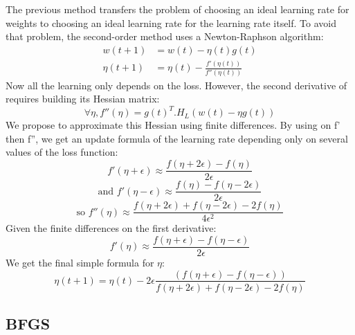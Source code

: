 \documentclass{article}
\begin{document}
  The previous method transfers the problem of choosing an ideal learning rate for weights to choosing an ideal learning rate for the learning rate itself. To avoid that problem, the second-order method uses a Newton-Raphson algorithm:\\
  \begin{align}  
  w(t+1) &= w(t) -\eta(t)g(t)\\
  \eta(t+1) &= \eta(t) - \frac{f'(\eta(t))}{f''(\eta(t))}
  \end{align}
  Now all the learning only depends on the loss. However, the second derivative of requires building its Hessian matrix:\\
  \begin{equation}
  \forall \eta, f''(\eta) = g(t)^{T}.H_{L}(w(t)-\eta g(t))
  \end{equation}
  We propose to approximate this Hessian using finite differences. By using on f' then f'', we get an update formula of the learning rate depending only on several values of the loss function:\\
  \begin{equation}
  f'(\eta+\epsilon) \approx \frac{f(\eta + 2\epsilon)-f(\eta)}{2\epsilon}
  \end{equation}
  \begin{equation}
  \text{and }f'(\eta-\epsilon) \approx \frac{f(\eta)-f(\eta-2\epsilon)}{2\epsilon}
  \end{equation}  
  \begin{equation}
  \text{so }f''(\eta) \approx \frac{f(\eta+2\epsilon)+f(\eta-2\epsilon)-2f(\eta)}{4 \epsilon^{2}}
  \end{equation}
  Given the finite differences on the first derivative:\\    
  \begin{equation}
  f'(\eta) \approx \frac{f(\eta+\epsilon)-f(\eta-\epsilon)}{2 \epsilon}
  \end{equation}
  We get the final simple formula for $\eta$:\\
  \begin{equation}
  \eta(t+1) = \eta(t) - 2\epsilon\frac{(f(\eta+\epsilon)-f(\eta-\epsilon))}{f(\eta+2\epsilon)+f(\eta-2\epsilon)-2f(\eta)}
  \end{equation}    
  
  
  
  \subsection{BFGS}
  
\end{document}

